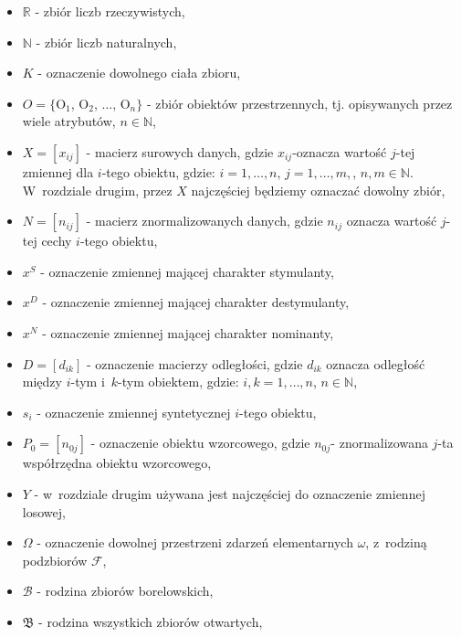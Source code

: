 \documentclass[12pt,a4paper]{report}
\newcommand{\mediana}{\operatorname{med}}
\newcommand{\licznosc}[1]{\overline{\overline{#1}}}
\begin{document}
\begin{itemize}
\item $\mathbb{R}$ - zbiór liczb rzeczywistych,
\item $\mathbb{N}$ - zbiór liczb naturalnych,
\item $K$ - oznaczenie dowolnego ciała zbioru,
\item $O = \{$O$_{1}$, O$_{2}$, $\dots$, O$_{n}\}$ - zbiór obiektów przestrzennych, tj. opisywanych przez wiele atrybutów, $n \in \mathbb{N}$,
\item $X=[x_{ij}]$ - macierz surowych danych, gdzie $x_{ij}$-oznacza wartość $j$-tej zmiennej dla $i$-tego obiektu, gdzie: $i=1,\ldots,n$, $j=1,\ldots, m,$, $n,m \in \mathbb{N}$. W~rozdziale drugim, przez $X$ najczęściej będziemy oznaczać dowolny zbiór,
\item $N=[n_{ij}]$ - macierz znormalizowanych danych, gdzie $n_{ij}$ oznacza wartość $j$-tej cechy $i$-tego obiektu,
\item $x^{S}$ - oznaczenie zmiennej mającej charakter stymulanty,
\item $x^{D}$ - oznaczenie zmiennej mającej charakter destymulanty,
\item $x^{N}$ - oznaczenie zmiennej mającej charakter nominanty,
\item $D=[d_{ik}]$ - oznaczenie macierzy odległości, gdzie $d_{ik}$ oznacza odległość między $i$-tym i~$k$-tym obiektem, gdzie: $i, k=1,\ldots,n$, $n \in \mathbb{N}$,
\item $s_{i}$ - oznaczenie zmiennej syntetycznej $i$-tego obiektu,
\item $P_{0}=[n_{0j}]$ - oznaczenie obiektu wzorcowego, gdzie $n_{0j}$- znormalizowana $j$-ta współrzędna obiektu wzorcowego,
\item $Y$ - w~rozdziale drugim używana jest najczęściej do oznaczenie zmiennej losowej,
\item $\Omega$ - oznaczenie dowolnej przestrzeni zdarzeń elementarnych $\omega$, z~rodziną podzbiorów $\mathcal{F}$,
\item $\mathcal{B}$ - rodzina zbiorów borelowskich,
\item $\mathfrak{B}$ - rodzina wszystkich zbiorów otwartych, %

\end{itemize}
\end{document}
